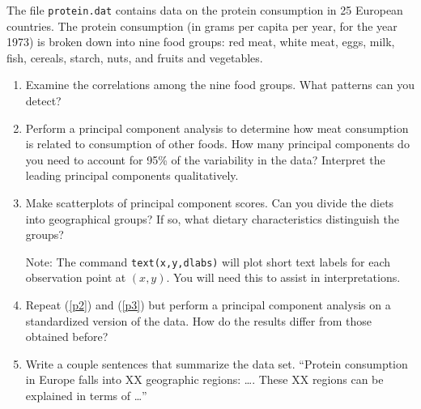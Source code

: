 \documentclass[11pt,titlepage,fleqn]{article}
\begin{document}
The file \verb+protein.dat+ contains data on the protein consumption in 25 European countries. The protein consumption (in grams per capita per year, for the year 1973) is broken down into nine food groups: red meat, white meat, eggs, milk, fish, cereals, starch, nuts, and fruits and vegetables.
%
\begin{enumerate}
\item Examine the correlations among the nine food groups. What patterns can you detect?

\label{p1}

\vertgap
\vertgap

\item Perform a principal component analysis to determine how meat consumption is related to consumption of other foods. How many principal components do you need to account for 95\% of the variability in the data? Interpret the leading principal components qualitatively.

\label{p2}

\vertgap
\vertgap

\item Make scatterplots of principal component scores. Can you divide the diets into geographical groups? If so, what dietary characteristics distinguish the groups?

Note: The command \verb+text(x,y,dlabs)+ will plot short text labels for each observation point at $(x,y)$. You will need this to assist in interpretations.

\label{p3}

\vertgap
\vertgap

\item Repeat (\ref{p2}) and (\ref{p3}) but perform a principal component analysis on a standardized version of the data. How do the results differ from those obtained before?

\vertgap
\vertgap

\item Write a couple sentences that summarize the data set. ``Protein consumption in Europe falls into XX geographic regions: \ldots. These XX regions can be explained in terms of \ldots''

\end{enumerate}

%
%

\end{document}
